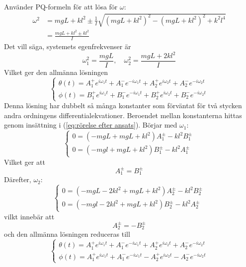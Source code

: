 Använder PQ-formeln för att lösa för $\omega$:
\begin{align}
    \omega^2 &= mgL+kl^2 \pm \frac{1}{I}\sqrt{ (mgL+kl^2)^2-(mgL+kl^2)^2 + k^2l^4 }\\
    &= \frac{mgL+kl^2\pm kl^2}{I} 
\end{align}
Det vill säga, systemets egenfrekvenser är \begin{equation}
    \omega_1^2 = \frac{mgL}{I}, \quad  \omega_2^2 = \frac{mgL+2kl^2}{I}
\end{equation}
Vilket ger den allmänna lösningen 
\begin{equation}
    \begin{cases}
        \theta(t) = A_1^+e^{i\omega_1t}+A_1^-e^{-i\omega_1t}+A_2^+e^{i\omega_2t}+A_2^-e^{-i\omega_2t}\\
        \phi(t) = B_1^+e^{i\omega_1t}+B_1^-e^{-i\omega_1t}+B_2^+e^{i\omega_2t}+B_2^-e^{-i\omega_2t}
    \end{cases}
\end{equation}
Denna lösning har dubbelt så många konstanter som förväntat för två stycken andra ordningens differentialekvationer. Beroendet mellan konstanterna hittas genom insättning i (\ref{eq:rörelse efter ansats}). Börjar med $\omega_1$:
\begin{equation}
    \begin{cases}
        0 = (-mgL+mgL+kl^2)A_1^\pm-{kl^2}B_1^\pm \\
        0 = (-mgl+mgL+kl^2)B_1^\pm-{kl^2}A_1^\pm
    \end{cases}
\end{equation}
Vilket ger att \begin{equation}
    A_1^\pm = B_1^\pm
\end{equation}
Därefter, $\omega_2$: \begin{equation}
    \begin{cases}
        0 = (-mgL-2kl^2+mgL+kl^2)A_2^\pm-{kl^2}B_2^\pm \\
            0 = (-mgl-2kl^2+mgL+kl^2)B_2^\pm-{kl^2}A_2^\pm
    \end{cases}
\end{equation}
vilkt innebär att \begin{equation}
    A_2^\pm = -B_2^\pm
\end{equation}
och den allmänna lösningen reduceras till \begin{equation}
    \begin{cases}
        \theta(t) = A_1^+e^{i\omega_1t}+A_1^-e^{-i\omega_1t}+A_2^+e^{i\omega_2t}+A_2^-e^{-i\omega_2t}\\
        \phi(t) = A_1^+e^{i\omega_1t}+A_1^-e^{-i\omega_1t}-A_2^+e^{i\omega_2t}-A_2^-e^{-i\omega_2t}
    \end{cases}
\end{equation}
